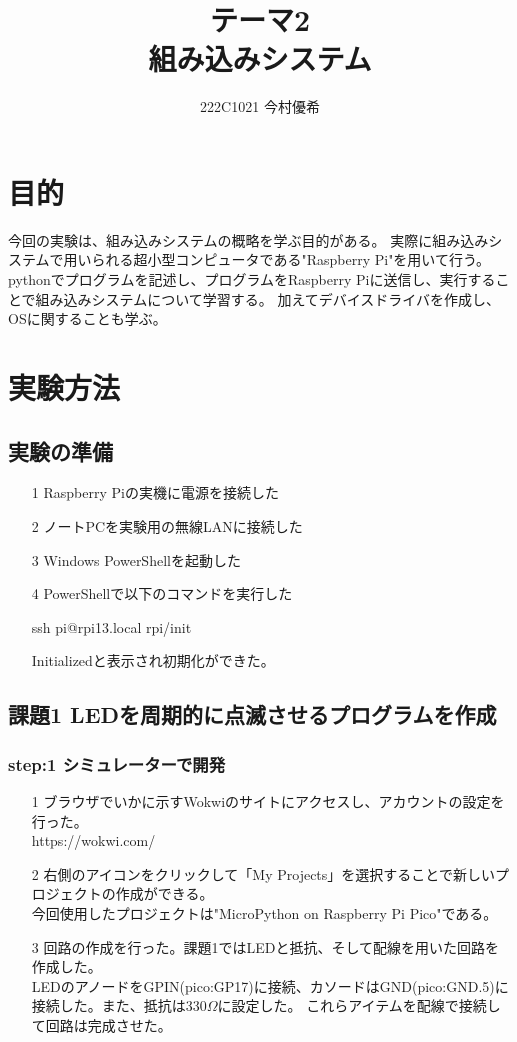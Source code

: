 \documentclass[dvipdfmx]{jsarticle}
\begin{document}
\title{テーマ2 \\組み込みシステム}
\author{222C1021 今村優希}
\maketitle
\newpage

\section{目的}
今回の実験は、組み込みシステムの概略を学ぶ目的がある。
実際に組み込みシステムで用いられる超小型コンピュータである"Raspberry Pi"を用いて行う。
pythonでプログラムを記述し、プログラムをRaspberry Piに送信し、実行することで組み込みシステムについて学習する。
加えてデバイスドライバを作成し、OSに関することも学ぶ。

\section{実験方法}
\subsection{実験の準備}
\begin{itemize}
  \item[1] Raspberry Piの実機に電源を接続した
  \item[2] ノートPCを実験用の無線LANに接続した
  \item[3] Windows PowerShellを起動した
  \item[4] PowerShellで以下のコマンドを実行した
  \begin{center}
    ssh pi@rpi13.local rpi/init
  \end{center}
  Initializedと表示され初期化ができた。
\end{itemize}

\subsection{課題1 LEDを周期的に点滅させるプログラムを作成}
\subsubsection{step:1 シミュレーターで開発}
\begin{itemize}
  \item[1] ブラウザでいかに示すWokwiのサイトにアクセスし、アカウントの設定を行った。\\
  https://wokwi.com/
  \item[2] 右側のアイコンをクリックして「My Projects」を選択することで新しいプロジェクトの作成ができる。\\
  今回使用したプロジェクトは"MicroPython on Raspberry Pi Pico"である。
  \item[3] 回路の作成を行った。課題1ではLEDと抵抗、そして配線を用いた回路を作成した。\\
  LEDのアノードをGPIN(pico:GP17)に接続、カソードはGND(pico:GND.5)に接続した。また、抵抗は330$\Omega$に設定した。
  これらアイテムを配線で接続して回路は完成させた。
\end{itemize} 
\end{document}
